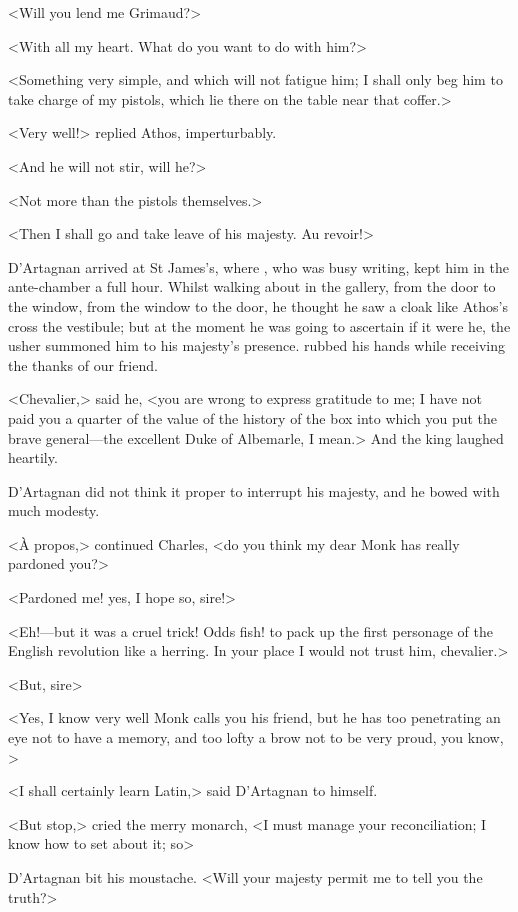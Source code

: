 <Will you lend me Grimaud?>

<With all my heart. What do you want to do with him?>

<Something very simple, and which will not fatigue him; I shall only beg him to take charge of my pistols, which lie there on the table near that coffer.>

<Very well!> replied Athos, imperturbably.

<And he will not stir, will he?>

<Not more than the pistols themselves.>

<Then I shall go and take leave of his majesty. Au revoir!>

D'Artagnan arrived at St James's, where , who was busy writing, kept him in the ante-chamber a full hour. Whilst walking about in the gallery, from the door to the window, from the window to the door, he thought he saw a cloak like Athos's cross the vestibule; but at the moment he was going to ascertain if it were he, the usher summoned him to his majesty's presence.  rubbed his hands while receiving the thanks of our friend.

<Chevalier,> said he, <you are wrong to express gratitude to me; I have not paid you a quarter of the value of the history of the box into which you put the brave general—the excellent Duke of Albemarle, I mean.> And the king laughed heartily.

D'Artagnan did not think it proper to interrupt his majesty, and he bowed with much modesty.

<À propos,> continued Charles, <do you think my dear Monk has really pardoned you?>

<Pardoned me! yes, I hope so, sire!>

<Eh!—but it was a cruel trick! Odds fish! to pack up the first personage of the English revolution like a herring. In your place I would not trust him, chevalier.>

<But, sire\longdash>

<Yes, I know very well Monk calls you his friend, but he has too penetrating an eye not to have a memory, and too lofty a brow not to be very proud, you know, >

<I shall certainly learn Latin,> said D'Artagnan to himself.

<But stop,> cried the merry monarch, <I must manage your reconciliation; I know how to set about it; so\longdash>

D'Artagnan bit his moustache. <Will your majesty permit me to tell you the truth?>

